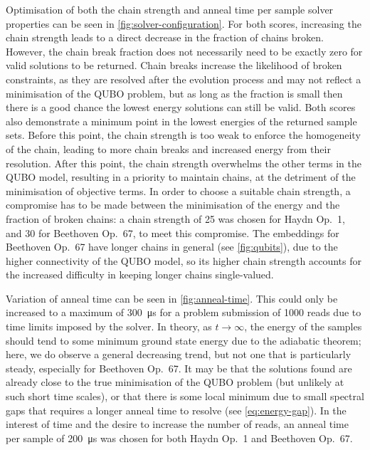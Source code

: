 \documentclass[12pt]{article}
\theoremstyle{definition}
\begin{document}
Optimisation of both the chain strength and anneal time per sample solver properties can be seen in \cref{fig:solver-configuration}. For both scores, increasing the chain strength leads to a direct decrease in the fraction of chains broken. However, the chain break fraction does not necessarily need to be exactly zero for valid solutions to be returned. Chain breaks increase the likelihood of broken constraints, as they are resolved after the evolution process and may not reflect a minimisation of the QUBO problem, but as long as the fraction is small then there is a good chance the lowest energy solutions can still be valid. Both scores also demonstrate a minimum point in the lowest energies of the returned sample sets. Before this point, the chain strength is too weak to enforce the homogeneity of the chain, leading to more chain breaks and increased energy from their resolution. After this point, the chain strength overwhelms the other terms in the QUBO model, resulting in a priority to maintain chains, at the detriment of the minimisation of objective terms. In order to choose a suitable chain strength, a compromise has to be made between the minimisation of the energy and the fraction of broken chains: a chain strength of \num{25} was chosen for Haydn Op.\ 1, and \num{30} for Beethoven Op.\ 67, to meet this compromise. The embeddings for Beethoven Op.\ 67 have longer chains in general (see \cref{fig:qubits}), due to the higher connectivity of the QUBO model, so its higher chain strength accounts for the increased difficulty in keeping longer chains single-valued.

Variation of anneal time can be seen in \cref{fig:anneal-time}. This could only be increased to a maximum of \qty{300}{\us} for a problem submission of \num{1000} reads due to time limits imposed by the solver. In theory, as $t\to\infty$, the energy of the samples should tend to some minimum ground state energy due to the adiabatic theorem; here, we do observe a general decreasing trend, but not one that is particularly steady, especially for Beethoven Op.\ 67. It may be that the solutions found are already close to the true minimisation of the QUBO problem (but unlikely at such short time scales), or that there is some local minimum due to small spectral gaps that requires a longer anneal time to resolve (see \cref{eq:energy-gap}). In the interest of time and the desire to increase the number of reads, an anneal time per sample of \qty{200}{\us} was chosen for both Haydn Op.\ 1 and Beethoven Op.\ 67.
\end{document}
